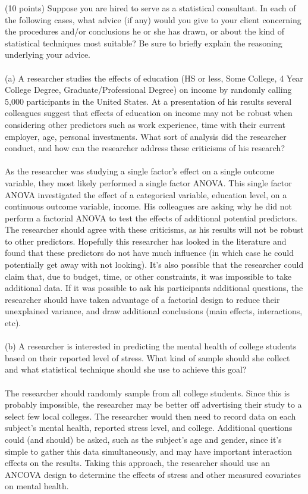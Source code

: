 \documentclass[onecolumn,10pt]{jhwhw}
\begin{document}
\problem{}
(10 points) Suppose you are hired to serve as a statistical consultant. In each of the following cases, what advice (if any) would you give to your client concerning the procedures and/or conclusions he or she has drawn, or about the kind of statistical techniques most suitable? Be sure to briefly explain the reasoning underlying your advice.\\
\\
(a) A researcher studies the effects of education (HS or less, Some College, 4 Year College Degree, Graduate/Professional Degree) on income by randomly calling 5,000 participants in the United States. At a presentation of his results several colleagues suggest that effects of education on income may not be robust when considering other predictors such as work experience, time with their current employer, age, personal investments. What sort of analysis did the researcher conduct, and how can the researcher address these criticisms of his research?\\
\\
As the researcher was studying a single factor's effect on a single outcome variable, they most likely performed a single factor ANOVA. This single factor ANOVA investigated the effect of a categorical variable, education level, on a continuous outcome variable, income. His colleagues are asking why he did not perform a factorial ANOVA to test the effects of additional potential predictors. The researcher should agree with these criticisms, as his results will not be robust to other predictors. Hopefully this researcher has looked in the literature and found that these predictors do not have much influence (in which case he could potentially get away with not looking). It's also possible that the researcher could claim that, due to budget, time, or other constraints, it was impossible to take additional data. If it was possible to ask his participants additional questions, the researcher should have taken advantage of a factorial design to reduce their unexplained variance, and draw additional conclusions (main effects, interactions, etc).\\
\\
(b) A researcher is interested in predicting the mental health of college students based on their reported level of stress. What kind of sample should she collect and what statistical technique should she use to achieve this goal?\\
\\
The researcher should randomly sample from all college students. Since this is probably impossible, the researcher may be better off advertising their study to a select few local colleges. The researcher would then need to record data on each subject's mental health, reported stress level, and college. Additional questions could (and should) be asked, such as the subject's age and gender, since it's simple to gather this data simultaneously, and may have important interaction effects on the results. Taking this approach, the researcher should use an ANCOVA design to determine the effects of stress and other measured covariates on mental health.\\
\end{document}
